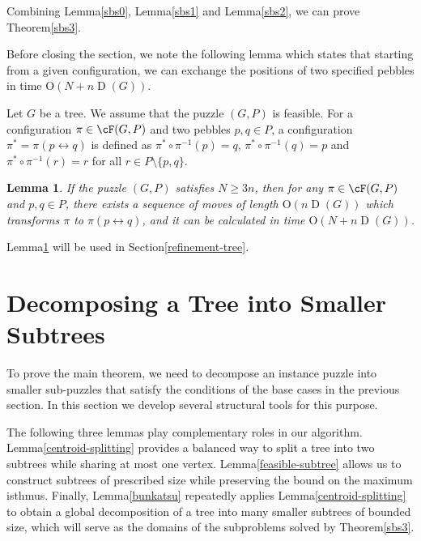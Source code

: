 \documentclass[letter,11pt]{article}
\newtheorem{la}[thm]{Lemma}
\theoremstyle{definition}
\theoremstyle{definition}
\DeclareMathOperator{\D}{D}
\newcommand{\1}{\boldmath$~1~$\unboldmath}
\newcommand{\Ord}{\mathrm{O}}
\newcommand{\tume}{\hspace*{0.2em}}
\begin{document}
Combining Lemma\tume\ref{sbs0}, Lemma\tume\ref{sbs1} and Lemma\tume\ref{sbs2}, we can prove Theorem\tume\ref{sbs3}. 

Before closing the section, we note the following lemma which states that starting from a given configuration, we can exchange the positions of two specified pebbles in time $\Ord (N + n\D(G))$.

Let $G$ be a tree.
We assume that the puzzle $(G, P)$ is feasible.
For a configuration $\pi \in \cF(G, P)$ and two pebbles $p, q \in P$, a configuration $\pi^\ast = \pi(p\leftrightarrow q)$ is defined as $\pi^\ast \circ \pi^{-1} (p) = q$, $\pi^\ast \circ \pi^{-1} (q) = p$ and $\pi^\ast \circ \pi^{-1} (r) = r$ for all $r \in P \setminus \{ p, q \}$.

\begin{la}\label{sbs4}
If the puzzle $(G, P)$ satisfies $N \ge 3n$, then for any $\pi \in \cF(G, P)$ and $p, q \in P$, there exists a sequence of moves of length $\Ord (n\D(G))$ which transforms $\pi$ to $\pi(p\leftrightarrow q)$, and it can be calculated in time $\Ord (N + n\D(G))$.
\end{la}

Lemma\tume\ref{sbs4} will be used in Section\tume\ref{refinement-tree}. 
 

\section{Decomposing a Tree into Smaller Subtrees}\label{splitting-tree}

To prove the main theorem, we need to decompose an instance puzzle 
into smaller sub-puzzles that satisfy the conditions of the base cases 
in the previous section. In this section we develop several structural
tools for this purpose.

The following three lemmas play complementary roles in our algorithm.
Lemma\tume\ref{centroid-splitting} provides a balanced way to split a tree
into two subtrees while sharing at most one vertex.
Lemma\tume\ref{feasible-subtree} allows us to construct subtrees of
prescribed size while preserving the bound on the maximum isthmus.
Finally, Lemma\tume\ref{bunkatsu} repeatedly applies 
Lemma\tume\ref{centroid-splitting} to obtain a global decomposition of a
tree into many smaller subtrees of bounded size, which will serve as the
domains of the subproblems solved by Theorem\tume\ref{sbs3}.
\end{document}
